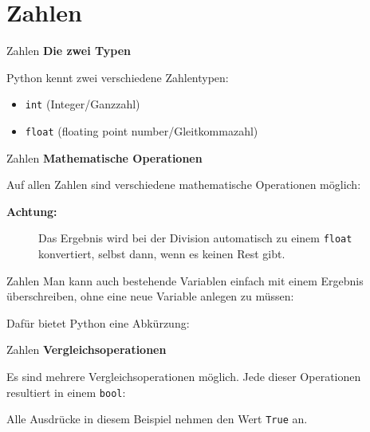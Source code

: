 \section{Zahlen}
\begin{frame}{Zahlen}
	\textbf{Die zwei Typen}
	\linebreak
	
	Python kennt zwei verschiedene Zahlentypen: 
	\begin{itemize}
		\item \alert{\texttt{int}} (Integer/Ganzzahl)
		
		\item \alert{\texttt{float}} (floating point number/Gleitkommazahl)
		
	\end{itemize}		
\end{frame}

\begin{frame}{Zahlen}
	\textbf{Mathematische Operationen}
	\linebreak

	Auf allen Zahlen sind verschiedene mathematische Operationen möglich:
	
	\begin{description}
		\item[\textbf{Achtung:}] Das Ergebnis wird bei der Division automatisch zu einem \alert{\texttt{float}} konvertiert, selbst dann, wenn es keinen Rest gibt.
	\end{description}
\end{frame}

\begin{frame}{Zahlen}
	Man kann auch bestehende Variablen einfach mit einem Ergebnis überschreiben, ohne eine neue Variable anlegen zu müssen:
	
	Dafür bietet Python eine Abkürzung:
	
\end{frame}

\begin{frame}{Zahlen}
	\textbf{Vergleichsoperationen}
	\linebreak
	
	Es sind mehrere Vergleichsoperationen möglich. Jede dieser Operationen resultiert in einem \alert{\texttt{bool}}:		
	
	Alle Ausdrücke in diesem Beispiel nehmen den Wert \alert{\texttt{True}} an.
\end{frame}

